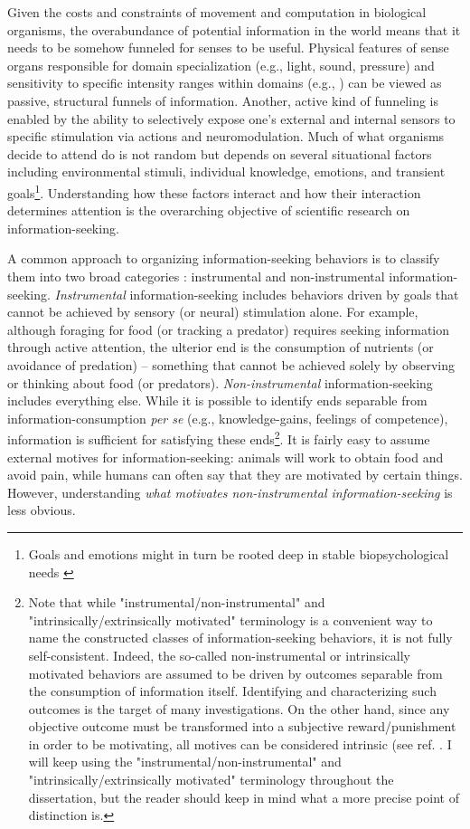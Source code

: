 Given the costs and constraints of movement and computation in biological organisms, the overabundance of potential information in the world means that it needs to be somehow funneled \cite{gottlieb_towards_2018} for senses to be useful. Physical features of sense organs responsible for domain specialization (e.g., light, sound, pressure) and sensitivity to specific intensity ranges within domains (e.g., \cite{schwab_evolution_2018}) can be viewed as passive, structural funnels of information. Another, active kind of funneling is enabled by the ability to selectively expose one's external and internal sensors to specific stimulation via actions and neuromodulation. Much of what organisms decide to attend do is not random but depends on several situational factors including environmental stimuli, individual knowledge, emotions, and transient goals\footnote{Goals and emotions might in turn be rooted deep in stable biopsychological needs \cite{ryan2017self}}. Understanding how these factors interact and how their interaction determines attention is the overarching objective of scientific research on information-seeking.

A common approach to organizing information-seeking behaviors is to classify them into two broad categories \cite{gottlieb_information-seeking_2013,gottlieb_towards_2018}: instrumental and non-instrumental information-seeking. \emph{Instrumental} information-seeking includes behaviors driven by goals that cannot be achieved by sensory (or neural) stimulation alone. For example, although foraging for food (or tracking a predator) requires seeking information through active attention, the ulterior end is the consumption of nutrients (or avoidance of predation) -- something that cannot be achieved solely by observing or thinking about food (or predators). \emph{Non-instrumental} information-seeking includes everything else. While it is possible to identify ends separable from information-consumption \emph{per se} (e.g., knowledge-gains, feelings of competence), information is sufficient for satisfying these ends\footnote{Note that while "instrumental/non-instrumental" and "intrinsically/extrinsically motivated" terminology is a convenient way to name the constructed classes of information-seeking behaviors, it is not fully self-consistent. Indeed, the so-called non-instrumental or intrinsically motivated behaviors are assumed to be driven by outcomes separable from the consumption of information itself. Identifying and characterizing such outcomes is the target of many investigations. On the other hand, since any objective outcome must be transformed into a subjective reward/punishment in order to be motivating, all motives can be considered intrinsic (see ref. \cite{juechems_where_2019}. I will keep using the "instrumental/non-instrumental" and "intrinsically/extrinsically motivated" terminology throughout the dissertation, but the reader should keep in mind what a more precise point of distinction is.}. It is fairly easy to assume external motives for information-seeking: animals will work to obtain food and avoid pain, while humans can often say that they are motivated by certain things. However, understanding \emph{what motivates non-instrumental information-seeking} is less obvious.

